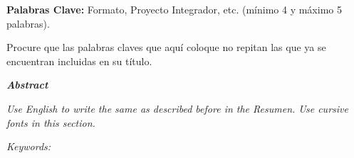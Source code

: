 \documentclass[12pt,oneside]{report}
\begin{document}
\noindent\textbf{Palabras Clave:} Formato, Proyecto Integrador, etc. (mínimo 4 y máximo 5 palabras).

\noindent Procure que las palabras claves que aquí coloque no repitan las que ya se encuentran incluidas en su título.

\clearpage
{}
{\centering\bfseries\itshape Abstract\par}
\noindent\textit{Use English to write the same as described before in the Resumen. Use cursive fonts in this section.}

\noindent\textit{Keywords:}

\clearpage
{}
\begingroup\singlespacing
\setlength{\cftbeforesecskip}{4pt}\setlength{\cftbeforesubsecskip}{4pt}\setlength{\cftbeforechapskip}{4pt}
\tableofcontents
\endgroup
\end{document}
